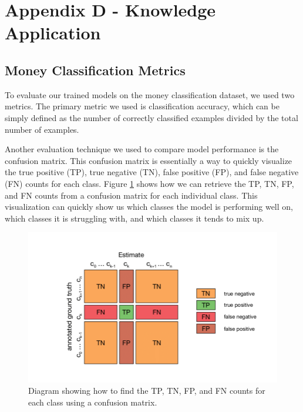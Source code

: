 \documentclass[a4paper,11pt]{article}
\begin{document}
\section{Appendix D - Knowledge Application}

\subsection{Money Classification Metrics}
To evaluate our trained models on the money classification dataset, we used two metrics. The primary metric we used is classification accuracy, which can be simply defined as the number of correctly classified examples divided by the total number of examples.

Another evaluation technique we used to compare model performance is the confusion matrix. This confusion matrix is essentially a way to quickly visualize the true positive (TP), true negative (TN), false positive (FP), and false negative (FN) counts for each class. Figure \ref{fig:conf_matrix_diagram} shows how we can retrieve the TP, TN, FP, and FN counts from a confusion matrix for each individual class. This visualization can quickly show us which classes the model is performing well on, which classes it is struggling with, and which classes it tends to mix up.

\begin{figure}[H]
\centering
\includegraphics[scale=0.5]{img/conf_matrix_diagram.png}
\caption{Diagram showing how to find the TP, TN, FP, and FN counts for each class using a confusion matrix. \cite{conf-mat-diagram}}
\label{fig:conf_matrix_diagram}
\end{figure}
\end{document}
